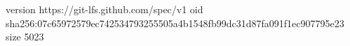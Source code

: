 version https://git-lfs.github.com/spec/v1
oid sha256:07c65972579ec742534793255505a4b1548fb99dc31d87fa091f1ec907795e23
size 5023
